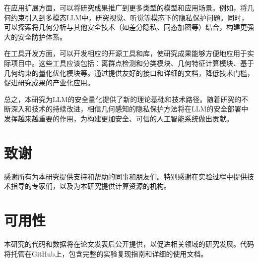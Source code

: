 在应用扩展方面，可以将研究成果推广到更多类型的模型和应用场景。例如，将几何约束引入到多模态LLM中，研究视觉、听觉等模态下的隐私保护问题。同时，可以探索将几何分析与其他安全技术（如差分隐私、同态加密等）结合，构建更强大的安全防护体系。

在工具开发方面，可以开发相应的开源工具和库，使研究成果能够方便地应用于实际项目中。这些工具应该包括：离群点检测和分类模块、几何特征计算模块、基于几何约束的量化优化模块等。通过提供友好的接口和详细的文档，降低技术门槛，促进研究成果的产业化应用。

总之，本研究为LLM的安全量化提供了新的理论基础和技术路径。随着研究的不断深入和技术的持续改进，相信几何感知的隐私保护方法将在LLM的安全部署中发挥越来越重要的作用，为构建更加安全、可信的人工智能系统做出贡献。

\section*{致谢}

感谢所有为本研究提供支持和帮助的同事和朋友们。特别感谢在实验过程中提供技术指导的专家们，以及为本研究提供计算资源的机构。

\section*{可用性}

本研究的代码和数据将在论文发表后公开提供，以促进相关领域的研究发展。代码将托管在GitHub上，包含完整的实验复现指南和详细的使用文档。






